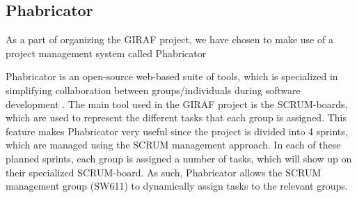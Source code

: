 \subsection{Phabricator}
As a part of organizing the GIRAF project, we have chosen to make use of a
project management system called Phabricator\nl

Phabricator is an open-source web-based suite of tools, which is specialized in
simplifying collaboration between groups/individuals during software development
\cite{phabricator}. The main tool used in the GIRAF project is the SCRUM-boards,
which are used to represent the different tasks that each group is assigned.
This feature makes Phabricator very useful since the project is divided into 4
sprints, which are managed using the SCRUM management approach.
In each of these planned sprints, each group is assigned a number of tasks,
which will show up on their specialized SCRUM-board. As such, Phabricator allows
the SCRUM management group (SW611) to dynamically assign tasks to the relevant
groups.